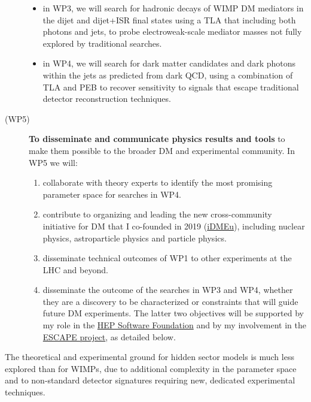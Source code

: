 \begin{description}
\begin{itemize} 
\item in WP3, we will search for hadronic decays of WIMP DM mediators in the dijet and dijet+ISR final states using a TLA that including both photons and jets, to probe electroweak-scale mediator masses not fully explored by traditional searches.
\item in WP4, we will search for dark matter candidates and dark photons within the jets as predicted from dark QCD, using a combination of TLA and PEB to recover sensitivity to signals that escape traditional detector reconstruction techniques.
\end{itemize}

\item[(WP5)] \textbf{To disseminate and communicate physics results and tools} to make them possible to the broader DM and experimental community. In WP5 we will: 

\begin{enumerate} 
\item collaborate with theory experts to identify the most promising parameter space for searches in WP4. 
\item contribute to organizing and leading the new cross-community initiative for DM that I co-founded in 2019 (\href{https://indico.cern.ch/e/iDMEu/}{iDMEu}), including nuclear physics, astroparticle physics and particle physics.
\item disseminate technical outcomes of WP1 to other experiments at the LHC and beyond. 
\item disseminate the outcome of the searches in WP3 and WP4, whether they are a discovery to be characterized or constraints that will guide future DM experiments. The latter two objectives will be supported by my role in the \href{https://hepsoftwarefoundation.org}{HEP Software Foundation} and by my involvement in the \href{https://projectescape.eu}{ESCAPE project}, as detailed below. 
\end{enumerate} 

\end{description}


The theoretical and experimental ground for hidden sector models is much less explored than for WIMPs, 
due to additional complexity in the parameter space and to non-standard detector signatures requiring new, dedicated experimental techniques. 


